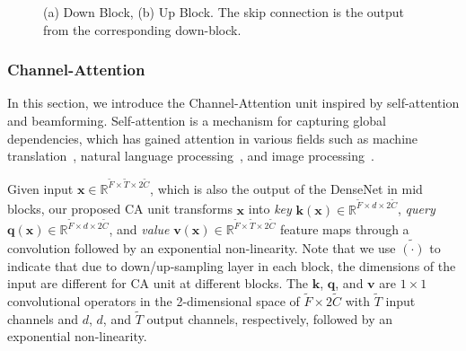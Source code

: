 \documentclass{article}
\newcommand{\smlv}{\mathbf{v}}
\newcommand{\x}{\mathbf{x}}
\newcommand{\kk}{\mathbf{k}}
\newcommand{\q}{\mathbf{q}}
\newcommand{\R}{{\mathbb{R}}}
\begin{document}
\begin{figure}[htb]
\begin{minipage}[b]{1.0\linewidth}
	\end{minipage}
	\vspace*{-7mm}
	\caption{(a) Down Block, (b) Up Block. The skip connection is the output from the corresponding down-block.}
	\label{fig:downup}
	\vspace*{-5mm}
\end{figure}
\vspace{-2mm}
\subsubsection{Channel-Attention}
\label{sec:sa}

In this section, we introduce the Channel-Attention unit inspired by self-attention and beamforming. Self-attention is a mechanism for capturing global dependencies, which has gained attention in various fields such as machine translation~\cite{bahdanau2014neural}, natural language processing~\cite{parikhetal2016decomposable}, and image processing~\cite{saGANs}. 


Given input $\x \in \R^{\widetilde{F} \times \widetilde{T} \times 2\widetilde{C}}$, which is also the output of the DenseNet in mid blocks, our proposed CA unit transforms $\x$ into {\it key} $\kk(\x) \in \R^{\widetilde{F} \times d \times 2\widetilde{C}}$, {\it query} $\q(\x) \in \R^{\widetilde{F} \times d \times 2\widetilde{C}}$, and {\it value} $\smlv(\x) \in \R^{\widetilde{F} \times \widetilde{T} \times 2\widetilde{C}}$ feature maps through a convolution followed by an exponential non-linearity. Note that we use $\widetilde{(\cdot)}$ to indicate that due to down/up-sampling layer in each block, the dimensions of the input are different for CA unit at different blocks. The $\kk$, $\q$, and $\smlv$ are $1\times 1$ convolutional operators in the 2-dimensional space of $\widetilde{F} \times 2\widetilde{C}$ with $\widetilde{T}$ input channels and $d$, $d$, and $\widetilde{T}$ output channels, respectively, followed by an exponential non-linearity.
\end{document}
